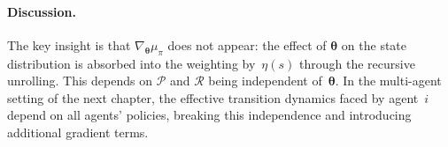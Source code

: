 \paragraph{Discussion.} The key insight is that $\nabla_{\bm{\theta}}\mu_\pi$ does not appear: the effect of $\bm{\theta}$ on the state distribution is absorbed into the weighting by~$\eta(s)$ through the recursive unrolling. This depends on $\mathcal{P}$ and $\mathcal{R}$ being independent of~$\bm{\theta}$. In the multi-agent setting of the next chapter, the effective transition dynamics faced by agent~$i$ depend on all agents' policies, breaking this independence and introducing additional gradient terms.
